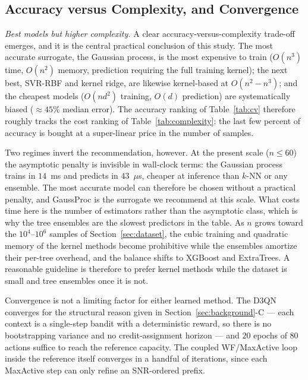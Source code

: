 \documentclass[journal]{IEEEtran}
\begin{document}
\subsection{Accuracy versus Complexity, and Convergence}
\emph{Best models but higher complexity.} A clear accuracy-versus-complexity trade-off
emerges, and it is the central practical conclusion of this study. The most accurate
surrogate, the Gaussian process, is the most expensive to train ($O(n^3)$ time, $O(n^2)$
memory, prediction requiring the full training kernel); the next best, SVR-RBF and kernel
ridge, are likewise kernel-based at $O(n^2\!-\!n^3)$; and the cheapest models
($O(nd^2)$ training, $O(d)$ prediction) are systematically biased ($\approx45\%$ median
error). The accuracy ranking of Table~\ref{tab:cv} therefore roughly tracks the cost
ranking of Table~\ref{tab:complexity}: the last few percent of accuracy is bought at a
super-linear price in the number of samples.

Two regimes invert the recommendation, however. At the present scale ($n\le60$) the
asymptotic penalty is invisible in wall-clock terms: the Gaussian process trains in
$14$~ms and predicts in $43$~$\mu$s, cheaper at inference than $k$-NN or any ensemble. The
most accurate model can therefore be chosen without a practical penalty, and GaussProc is
the surrogate we recommend at this scale. What costs time here is the number of estimators
rather than the asymptotic class, which is why the tree ensembles are the slowest
predictors in the table. As $n$ grows toward the $10^4$--$10^6$ samples of
Section~\ref{sec:dataset}, the cubic training and quadratic memory of the kernel methods
become prohibitive while the ensembles amortize their per-tree overhead, and the balance
shifts to XGBoost and ExtraTrees. A reasonable guideline is therefore to prefer kernel
methods while the dataset is small and tree ensembles once it is not.

Convergence is not a limiting factor for either learned method. The D3QN converges for the
structural reason given in Section~\ref{sec:background}-C --- each context is a single-step
bandit with a deterministic reward, so there is no bootstrapping variance and no
credit-assignment horizon --- and $20$ epochs of $80$ actions suffice to reach the
reference capacity. The coupled WF/MaxActive loop inside the reference itself converges in
a handful of iterations, since each MaxActive step can only refine an SNR-ordered prefix.
\end{document}
